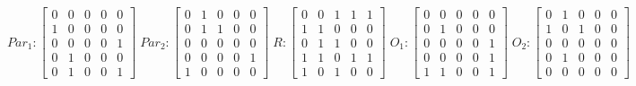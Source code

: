      $$
        Par_{1} : \begin{bmatrix}
            0 & 0 & 0 & 0 & 0 \\
            1 & 0 & 0 & 0 & 0 \\
            0 & 0 & 0 & 0 & 1 \\
			0 & 1 & 0 & 0 & 0 \\
            0 & 1 & 0 & 0 & 1 
        \end{bmatrix}
        \;
        Par_{2} : \begin{bmatrix}
            0 & 1 & 0 & 0 & 0 \\
            0 & 1 & 1 & 0 & 0 \\
            0 & 0 & 0 & 0 & 0 \\
            0 & 0 & 0 & 0 & 1 \\
            1 & 0 & 0 & 0 & 0
        \end{bmatrix}
        \;
        R : \begin{bmatrix}
            0 & 0 & 1 & 1 & 1 \\
            1 & 1 & 0 & 0 & 0 \\
            0 & 1 & 1 & 0 & 0 \\
            1 & 1 & 0 & 1 & 1 \\
            1 & 0 & 1 & 0 & 0
        \end{bmatrix}
        \;
        O_{1} : \begin{bmatrix}
            0 & 0 & 0 & 0 & 0 \\
            0 & 1 & 0 & 0 & 0 \\
            0 & 0 & 0 & 0 & 1 \\
            0 & 0 & 0 & 0 & 1 \\
            1 & 1 & 0 & 0 & 1
        \end{bmatrix}
        \;
        O_{2} : \begin{bmatrix}
            0 & 1 & 0 & 0 & 0 \\
            1 & 0 & 1 & 0 & 0 \\
            0 & 0 & 0 & 0 & 0 \\
            0 & 1 & 0 & 0 & 0 \\
            0 & 0 & 0 & 0 & 0
        \end{bmatrix}
    $$ 
